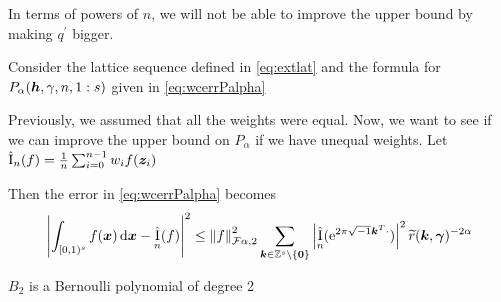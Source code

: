 \documentclass{iitthesis-au} %
\newcommand{\tr}{\widetilde{r}}
\newcommand{\appxintn}{\appxint_n}
\DeclareMathOperator{\appxint}{\hat{I}}
\begin{document}
In terms of powers of $n$, we will not be able to improve the upper bound by making $q^{'}$ bigger. 



Consider the lattice sequence defined in \eqref{eq:extlat} and the formula for $P_{\alpha}(\boldsymbol{h},\gamma, n, 1:s)$ given in \eqref{eq:wcerrPalpha}

Previously, we assumed that all the weights were equal. Now, we want to see if we can improve the upper bound on $P_{\alpha}$ if we have unequal weights. 
Let $\appxintn(f) = \frac{1}{n} \sum_{i=0}^{n-1} w_if(\vz_i) $

Then the error in \eqref{eq:wcerrPalpha} becomes
\begin{align*}
\nonumber
\abs{\int_{[0,1)^{s}} f(\vx) \, \dif \vx - \appxint_n(f)}^2 
& \le \norm[\cf{\alpha},2]{f}^2 \sum_{\vk \in \integers^s \setminus\{\vzero\}} \abs{\appxint_n(\me^{2 \pi \sqrt{-1} \vk^T \cdot})}^2\tr(\vk,\vgamma)^{-2\alpha} \\
\end{align*}





$B_2$ is a Bernoulli polynomial of degree 2 \cite{OlvEtal10a}
%


%
%
%

\end{document}
